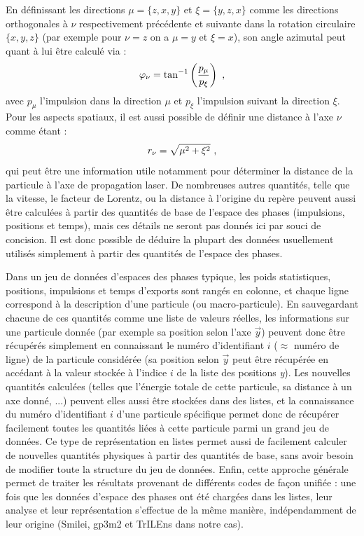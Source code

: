 \begin{refsection}
En définissant les directions $\mu=\{z,x,y\}$ et $\xi=\{y,z,x\}$ comme les directions orthogonales à $\nu$ respectivement précédente et suivante dans la rotation circulaire $\{x, y, z\}$ (par exemple pour $\nu=z$ on a $\mu=y$ et $\xi=x$), son angle azimutal peut quant à lui être calculé via :
\begin{equation}
    \varphi_\nu=\tan^{-1}\left(\dfrac{p_\mu}{p_\xi}\right) ~ \rm ,
\end{equation}
avec $p_\mu$ l'impulsion dans la direction $\mu$ et $p_\xi$ l'impulsion suivant la direction $\xi$. Pour les aspects spatiaux, il est aussi possible de définir une distance à l'axe $\nu$ comme étant :
\begin{equation}
r_\nu = \sqrt{\mu^2 + \xi^2} ~ \rm ,
\end{equation}
qui peut être une information utile notamment pour déterminer la distance de la particule à l'axe de propagation laser. De nombreuses autres quantités, telle que la vitesse, le facteur de Lorentz, ou la distance à l'origine du repère peuvent aussi être calculées à partir des quantités de base de l'espace des phases (impulsions, positions et temps), mais ces détails ne seront pas donnés ici par souci de concision. Il est donc possible de déduire la plupart des données usuellement utilisés simplement à partir des quantités de l'espace des phases.

Dans un jeu de données d'espaces des phases typique, les poids statistiques, positions, impulsions et temps d'exports sont rangés en colonne, et chaque ligne correspond à la description d'une particule (ou macro-particule). En sauvegardant chacune de ces quantités comme une liste de valeurs réelles, les informations sur une particule donnée (par exemple sa position selon l'axe $\vec{y}$) peuvent donc être récupérés simplement en connaissant le numéro d'identifiant $i$ ($\approx$ numéro de ligne) de la particule considérée (sa position selon $\vec{y}$ peut être récupérée en accédant à la valeur stockée à l'indice $i$ de la liste des positions \textit{y}). Les nouvelles quantités calculées (telles que l'énergie totale de cette particule, sa distance à un axe donné, ...) peuvent elles aussi être stockées dans des listes, et la connaissance du numéro d'identifiant $i$ d'une particule spécifique permet donc de récupérer facilement toutes les quantités liées à cette particule parmi un grand jeu de données. Ce type de représentation en listes permet aussi de facilement calculer de nouvelles quantités physiques à partir des quantités de base, sans avoir besoin de modifier toute la structure du jeu de données. Enfin, cette approche générale permet de traiter les résultats provenant de différents codes de façon unifiée : une fois que les données d'espace des phases ont été chargées dans les listes, leur analyse et leur représentation s'effectue de la même manière, indépendamment de leur origine (Smilei, gp3m2 et TrILEns dans notre cas).


\end{refsection}
